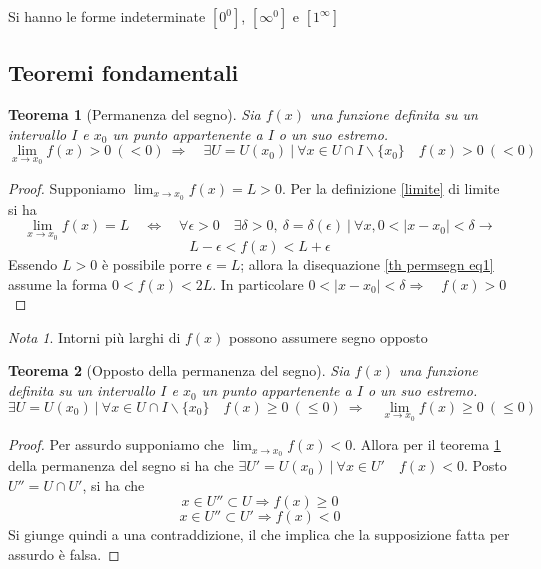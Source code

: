 \documentclass[]{report}
\theoremstyle{definition}
\theoremstyle{remark}
\newtheorem*{nota}{Nota}
\theoremstyle{plain}
\newtheorem{theor}{Teorema}[chapter]
\numberwithin{equation}{chapter}
\begin{document}
Si hanno le forme indeterminate $\left[0^{0}\right]$, $\left[\infty^{0}\right]$ e $\left[1^{\infty}\right]$ 

\subsection{Teoremi fondamentali}

\begin{theor}[Permanenza del segno] \label{th permsegn}
	Sia $f(x)$ una funzione definita su un intervallo $I$ e $x_{0}$ un punto appartenente a $I$ o un suo estremo. 
	$$\lim_{x \to x_{0}}f(x)>0 \ (<0) \ \Rightarrow \quad \exists U=U(x_{0}) \ | \ \forall x \in U \cap I \backslash \{x_{0}\} \quad f(x)>0 \ (<0)$$
\end{theor}
\begin{proof}
	Supponiamo $\lim_{x \to x_{0}}f(x)=L>0$. Per la definizione \ref{limite} di limite si ha
	$$\lim_{x\to x_{0}} f(x)=L \quad \Leftrightarrow \quad \forall \epsilon > 0 \quad \exists \delta > 0 ,\ \delta = \delta (\epsilon ) \ | \ \forall x, 0<|x-x_{0}|<\delta \rightarrow$$
	\begin{equation}\label{th permsegn eq1}
		L-\epsilon<f(x)<L+\epsilon
	\end{equation}
	Essendo $L>0$ \`{e} possibile porre $\epsilon=L$; allora la disequazione \eqref{th permsegn eq1} assume la forma $0<f(x)<2L$. In particolare $0<|x-x_{0}|<\delta \Rightarrow \quad f(x)>0$
\end{proof}
\begin{nota}
	Intorni pi\`{u} larghi di $f(x)$ possono assumere segno opposto
\end{nota}

\begin{theor}[Opposto della permanenza del segno]\label{th opppsgn}
	Sia $f(x)$ una funzione definita su un intervallo $I$ e $x_{0}$ un punto appartenente a $I$ o un suo estremo. 
	$$\exists U=U(x_{0}) \ | \ \forall x \in U \cap I \backslash \{x_{0}\} \quad f(x) \geq 0 \ (\leq 0) \ \Rightarrow \quad \lim_{x \to x_{0}}f(x) \geq 0 \ ( \leq 0)$$
\end{theor}
\begin{proof}
	Per assurdo supponiamo che $\lim_{x \to x_{0}}f(x) < 0$. Allora per il teorema \ref{th permsegn} della permanenza del segno si ha che $\exists U'=U(x_{0}) \ | \ \forall x \in U' \quad f(x)<0$. Posto $U''=U \cap U'$, si ha che
	$$x\in U'' \subset U \Rightarrow f(x) \geq 0$$
	$$x\in U'' \subset U' \Rightarrow f(x) < 0$$
	Si giunge quindi a una contraddizione, il che implica che la supposizione fatta per assurdo \`{e} falsa.
\end{proof}
\end{document}
